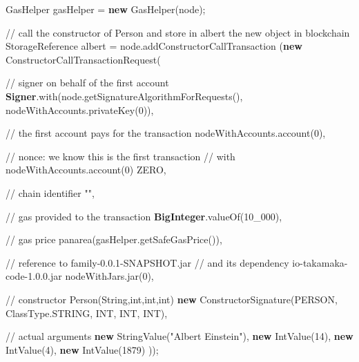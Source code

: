 \documentclass[a4paper,]{book}
\newenvironment{Shaded}{\begin{snugshade}}{\end{snugshade}}
\newcommand{\BuiltInTok}[1]{\textcolor[rgb]{0.39,0.29,0.61}{\textbf{#1}}}
\newcommand{\CommentTok}[1]{\textcolor[rgb]{0.54,0.53,0.53}{#1}}
\newcommand{\DecValTok}[1]{\textcolor[rgb]{0.69,0.50,0.00}{#1}}
\newcommand{\FunctionTok}[1]{\textcolor[rgb]{0.39,0.29,0.61}{#1}}
\newcommand{\KeywordTok}[1]{\textcolor[rgb]{0.12,0.11,0.11}{\textbf{#1}}}
\newcommand{\NormalTok}[1]{\textcolor[rgb]{0.12,0.11,0.11}{#1}}
\newcommand{\StringTok}[1]{\textcolor[rgb]{0.75,0.01,0.01}{#1}}
\renewenvironment{Shaded}{\begin{snugshade}\small}{\end{snugshade}}
\begin{document}
{\begin{Shaded}
\begin{Highlighting}[]
\NormalTok{      GasHelper gasHelper = }\KeywordTok{new} \FunctionTok{GasHelper}\NormalTok{(node);}

      \CommentTok{// call the constructor of Person and store in albert the new object in blockchain}
\NormalTok{      StorageReference albert = node.}\FunctionTok{addConstructorCallTransaction}
\NormalTok{        (}\KeywordTok{new} \FunctionTok{ConstructorCallTransactionRequest}\NormalTok{(}

          \CommentTok{// signer on behalf of the first account}
          \BuiltInTok{Signer}\NormalTok{.}\FunctionTok{with}\NormalTok{(node.}\FunctionTok{getSignatureAlgorithmForRequests}\NormalTok{(),}
\NormalTok{            nodeWithAccounts.}\FunctionTok{privateKey}\NormalTok{(}\DecValTok{0}\NormalTok{)),}

          \CommentTok{// the first account pays for the transaction}
\NormalTok{          nodeWithAccounts.}\FunctionTok{account}\NormalTok{(}\DecValTok{0}\NormalTok{),}

          \CommentTok{// nonce: we know this is the first transaction}
          \CommentTok{// with nodeWithAccounts.account(0)}
\NormalTok{          ZERO,}

          \CommentTok{// chain identifier}
          \StringTok{""}\NormalTok{,}

          \CommentTok{// gas provided to the transaction}
          \BuiltInTok{BigInteger}\NormalTok{.}\FunctionTok{valueOf}\NormalTok{(}\DecValTok{10_000}\NormalTok{),}

          \CommentTok{// gas price}
          \FunctionTok{panarea}\NormalTok{(gasHelper.}\FunctionTok{getSafeGasPrice}\NormalTok{()),}

          \CommentTok{// reference to family-0.0.1-SNAPSHOT.jar}
          \CommentTok{// and its dependency io-takamaka-code-1.0.0.jar}
\NormalTok{          nodeWithJars.}\FunctionTok{jar}\NormalTok{(}\DecValTok{0}\NormalTok{),}

          \CommentTok{// constructor Person(String,int,int,int)}
          \KeywordTok{new} \FunctionTok{ConstructorSignature}\NormalTok{(PERSON, ClassType.}\FunctionTok{STRING}\NormalTok{, INT, INT, INT),}

          \CommentTok{// actual arguments}
          \KeywordTok{new} \FunctionTok{StringValue}\NormalTok{(}\StringTok{"Albert Einstein"}\NormalTok{), }\KeywordTok{new} \FunctionTok{IntValue}\NormalTok{(}\DecValTok{14}\NormalTok{),}
          \KeywordTok{new} \FunctionTok{IntValue}\NormalTok{(}\DecValTok{4}\NormalTok{), }\KeywordTok{new} \FunctionTok{IntValue}\NormalTok{(}\DecValTok{1879}\NormalTok{)}
\NormalTok{      ));}


\end{Highlighting}
\end{Shaded}}
\end{document}
